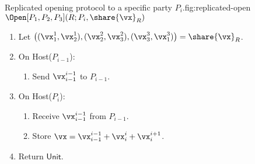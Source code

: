 \begin{Boxfig}{Replicated opening protocol to a specific party $P_i$.}{fig:replicated-open}
  {$\Open[P_1, P_2, P_3](R; P_i, \share{\vx}_R)$}
  
  \begin{enumerate}
  \item Let $\left( (\vx_1^1, \vx_2^1), (\vx_2^2, \vx_3^2), (\vx_3^3, \vx_1^3) \right) = \share{\vx}_R$.
  \item On Host($P_{i-1}$):
  \begin{enumerate}
    \item Send $\vx_{i-1}^{i-1}$ to $P_{i-1}$.
  \end{enumerate}
  \item On Host($P_i$):
  \begin{enumerate}
   \item Receive $\vx_{i-1}^{i-1}$ from $P_{i-1}$.
   \item Store $\vx = \vx_{i-1}^{i-1} + \vx_i^i + \vx_i^{i+1}$.
  \end{enumerate}
  \item Return $\mathsf{Unit}$.
\end{enumerate}
\end{Boxfig}


